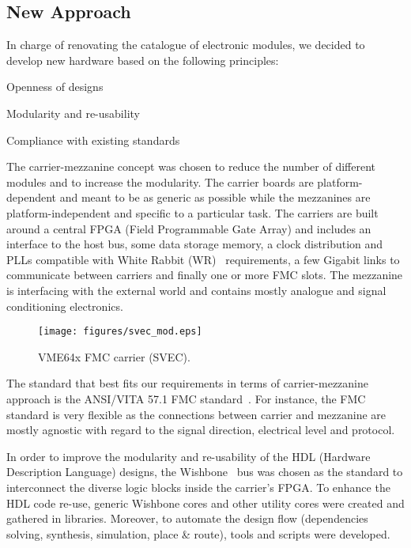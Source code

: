 \documentclass{JAC2003}
\begin{document}
\subsection{New Approach}
In charge of renovating the catalogue of electronic modules, we decided to develop new hardware based on the following principles:
\begin{Itemize}
\item Openness of designs
\item Modularity and re-usability
\item Compliance with existing standards
\end{Itemize}

The carrier-mezzanine concept was chosen to reduce the number of different modules and to increase the modularity.
The carrier boards are platform-dependent and meant to be as generic as possible while the mezzanines are platform-independent and specific to a particular task.
The carriers are built around a central FPGA (Field Programmable Gate Array) and includes an interface to the host bus, some data storage memory, a clock distribution and PLLs compatible with White Rabbit (WR)~\cite{wr} requirements, a few Gigabit links to communicate between carriers and finally one or more FMC slots.
The mezzanine is interfacing with the external world and contains mostly analogue and signal conditioning electronics.

\begin{figure}[htb]
   \centering
   \texttt{[image: figures/svec\_mod.eps]}
   \caption{VME64x FMC carrier (SVEC).}
   \label{svec}
\end{figure}

The standard that best fits our requirements in terms of carrier-mezzanine approach is the ANSI/VITA 57.1 FMC standard~\cite{fmc}.
For instance, the FMC standard is very flexible as the connections between carrier and mezzanine are mostly agnostic with regard to the signal direction, electrical level and protocol.

In order to improve the modularity and re-usability of the HDL (Hardware Description Language) designs, the Wishbone~\cite{wishbone} bus was chosen as the standard to interconnect the diverse logic blocks inside the carrier's FPGA.
To enhance the HDL code re-use, generic Wishbone cores and other utility cores were created and gathered in libraries.
Moreover, to automate the design flow (dependencies solving, synthesis, simulation, place \& route), tools and scripts were developed.
\end{document}

